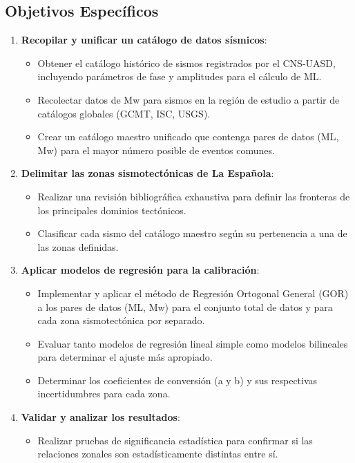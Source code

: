 \documentclass[12pt,a4paper]{article}
\begin{document}
\subsection{Objetivos Específicos}
\begin{enumerate}
    \item \textbf{Recopilar y unificar un catálogo de datos sísmicos}:
        \begin{itemize}
            \item Obtener el catálogo histórico de sismos registrados por el CNS-UASD, incluyendo parámetros de fase y amplitudes para el cálculo de ML.
            \item Recolectar datos de Mw para sismos en la región de estudio a partir de catálogos globales (GCMT, ISC, USGS).
            \item Crear un catálogo maestro unificado que contenga pares de datos (ML, Mw) para el mayor número posible de eventos comunes.
        \end{itemize}
    \item \textbf{Delimitar las zonas sismotectónicas de La Española}:
        \begin{itemize}
            \item Realizar una revisión bibliográfica exhaustiva para definir las fronteras de los principales dominios tectónicos.
            \item Clasificar cada sismo del catálogo maestro según su pertenencia a una de las zonas definidas.
        \end{itemize}
    \item \textbf{Aplicar modelos de regresión para la calibración}:
        \begin{itemize}
            \item Implementar y aplicar el método de Regresión Ortogonal General (GOR) a los pares de datos (ML, Mw) para el conjunto total de datos y para cada zona sismotectónica por separado.
            \item Evaluar tanto modelos de regresión lineal simple como modelos bilineales para determinar el ajuste más apropiado.
            \item Determinar los coeficientes de conversión (a y b) y sus respectivas incertidumbres para cada zona.
        \end{itemize}
    \item \textbf{Validar y analizar los resultados}:
        \begin{itemize}
            \item Realizar pruebas de significancia estadística para confirmar si las relaciones zonales son estadísticamente distintas entre sí.

\end{itemize}
\end{enumerate}
\end{document}
